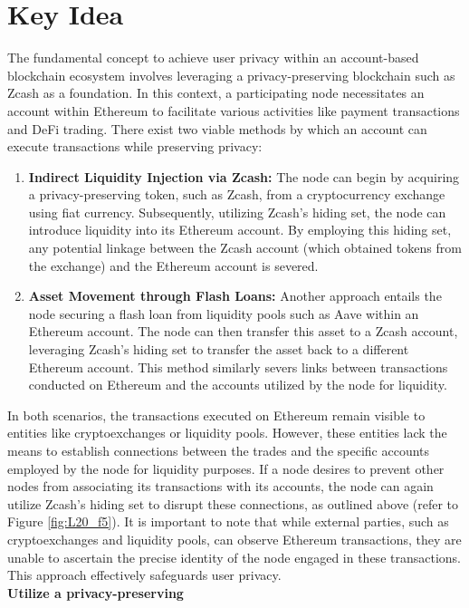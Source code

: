 \section{Key Idea}
The fundamental concept to achieve user privacy within an account-based blockchain ecosystem involves leveraging a privacy-preserving blockchain such as Zcash as a foundation. In this context, a participating node necessitates an account within Ethereum to facilitate various activities like payment transactions and DeFi trading. There exist two viable methods by which an account can execute transactions while preserving privacy:\\
\begin{enumerate}
	\item \textbf{Indirect Liquidity Injection via Zcash:} The node can begin by acquiring a privacy-preserving token, such as Zcash, from a cryptocurrency exchange using fiat currency. Subsequently, utilizing Zcash's hiding set, the node can introduce liquidity into its Ethereum account. By employing this hiding set, any potential linkage between the Zcash account (which obtained tokens from the exchange) and the Ethereum account is severed.
	\item \textbf{Asset Movement through Flash Loans:} Another approach entails the node securing a flash loan from liquidity pools such as Aave within an Ethereum account. The node can then transfer this asset to a Zcash account, leveraging Zcash's hiding set to transfer the asset back to a different Ethereum account. This method similarly severs links between transactions conducted on Ethereum and the accounts utilized by the node for liquidity.
\end{enumerate}
In both scenarios, the transactions executed on Ethereum remain visible to entities like cryptoexchanges or liquidity pools. However, these entities lack the means to establish connections between the trades and the specific accounts employed by the node for liquidity purposes. If a node desires to prevent other nodes from associating its transactions with its accounts, the node can again utilize Zcash's hiding set to disrupt these connections, as outlined above (refer to Figure \ref{fig:L20_f5}). It is important to note that while external parties, such as cryptoexchanges and liquidity pools, can observe Ethereum transactions, they are unable to ascertain the precise identity of the node engaged in these transactions. This approach effectively safeguards user privacy.\\
\textbf{Utilize a privacy-preserving}\\
